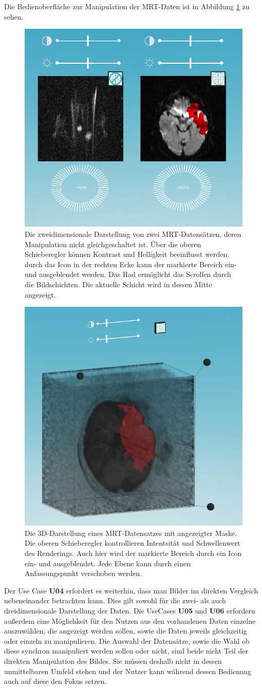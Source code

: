 Die Bedienoberfläche zur Manipulation der MRT-Daten ist in Abbildung \ref{img:mARt2d} zu sehen.

\begin{figure}
	\centering
	\includegraphics[width=0.5\linewidth]{images/mARt2d.png}
	\caption{Die zweidimensionale Darstellung von zwei MRT-Datensätzen, deren Manipulation nicht gleichgeschaltet ist. Über die oberen Schieberegler können Kontrast und Helligkeit beeinflusst werden. durch das Icon in der rechten Ecke kann der markierte Bereich ein- und ausgeblendet werden. Das Rad ermöglicht das Scrollen durch die Bildschichten. Die aktuelle Schicht wird in dessen Mitte angezeigt. }
	\label{img:mARt2d}
\end{figure}


\begin{figure}
	\centering
	\includegraphics[width=0.5\linewidth]{images/mARt3d.png}
	\caption{Die 3D-Darstellung eines MRT-Datensatzes mit angezeigter Maske. Die oberen Schieberegler kontrollieren Intentsität und Schwellenwert des Renderings. Auch hier wird der markierte Bereich durch ein Icon ein- und ausgeblendet. Jede Ebene kann durch einen Anfassungspunkt verschoben werden.}
	\label{img:mARt3d}
\end{figure}


Der Use Case \textbf{U04} erfordert es weiterhin, dass man Bilder im direkten Vergleich nebeneinander betrachten kann. Dies gilt sowohl für die zwei- als auch dreidimensionale Darstellung der Daten. Die UseCases \textbf{U05} und \textbf{U06} erfordern außerdem eine Möglichkeit für den Nutzen aus den vorhandenen Daten einzelne auszuwählen, die angezeigt werden sollen, sowie die Daten jeweils gleichzeitig oder einzeln zu manipulieren. 
Die Auswahl der Datensätze, sowie die Wahl ob diese synchron manipuliert werden sollen oder nicht, sind beide nicht Teil der direkten Manipulation des Bildes. Sie müssen deshalb nicht in dessen unmittelbaren Umfeld stehen und der Nutzer kann während dessen Bedienung auch auf diese den Fokus setzen.
 
